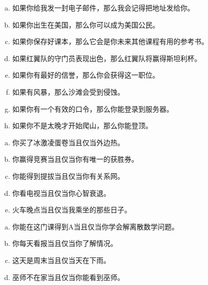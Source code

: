 {{        %
        \begin{practices}
            \begin{enumerate}[a)]
                \item 如果你给我发一封电子邮件，那么我会记得把地址发给你。
                \item 如果你出生在美国，那么你可以成为美国公民。
                \item 如果你保存好课本，那么它会是你未来其他课程有用的参考书。
                \item 如果红翼队的守门员表现出色，那么红翼队将赢得斯坦利杯。
                \item 如果你有最好的信誉，那么你会获得这一职位。
                \item 如果有风暴，那么沙滩会受到侵蚀。
                \item 如果你有一个有效的口令，那么你能登录到服务器。
                \item 如果你不是太晚才开始爬山，那么你能登顶。
            \end{enumerate}
        \end{practices}

        \begin{practices}
            \begin{enumerate}[a)]
                \item 你买了冰激凌蛋卷当且仅当外边热。
                \item 你赢得竞赛当且仅当你有唯一的获胜券。
                \item 你能得到提拔当且仅当你有关系网。
                \item 你看电视当且仅当你心智衰退。
                \item 火车晚点当且仅当我乘坐的那些日子。
            \end{enumerate}
        \end{practices}

        \begin{practices}
            \begin{enumerate}[a)]
                \item 你能在这门课得到A当且仅当你学会解离散数学问题。
                \item 你每天看报当且仅当你了解情况。
                \item 这天是周末当且仅当天在下雨。
                \item 巫师不在家当且仅当你能看到巫师。
            \end{enumerate}
        \end{practices}

}}
